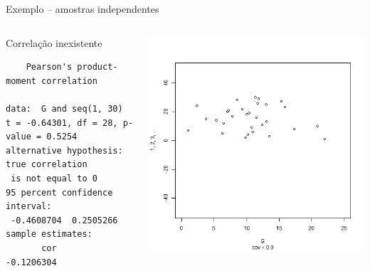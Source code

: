 \documentclass{beamer}
\begin{document}
\begin{frame}[fragile]{\scriptsize Exemplo -- amostras independentes}
  \begin{columns}
    \begin{column}{6cm}
      \begin{exampleblock}{Correlação inexistente}
        \tiny
\begin{verbatim}
	Pearson's product-moment correlation

data:  G and seq(1, 30)
t = -0.64301, df = 28, p-value = 0.5254
alternative hypothesis: true correlation
 is not equal to 0
95 percent confidence interval:
 -0.4608704  0.2505266
sample estimates:
       cor 
-0.1206304
\end{verbatim}
    \end{exampleblock}
   \end{column}
    \begin{column}{4cm}
  \begin{center}
    \includegraphics[height=.8\textheight]{Cap17/anim-n}
  \end{center}
    \end{column}
\end{columns}
\end{frame}
\end{document}

